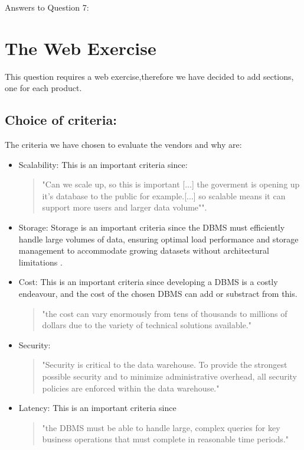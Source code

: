 \newpage Answers to Question 7:
\section{The Web Exercise}
This question requires a web exercise,therefore we have decided to add sections, one for each product. 

\subsection{Choice of criteria:}
The criteria we have chosen to evaluate the vendors and why are:
\begin{itemize}
    \item Scalability: This is an important criteria since:
    \begin{quotation}
        "Can we scale up, so this is important [...] the goverment is opening up it's database to the public for example.[...] so scalable means it can support more users and larger data volume"\cite[t.00:53:00]{l1video}".
    \end{quotation}
    \item Storage: Storage is an important criteria since
    the DBMS must efficiently handle large volumes of data, 
    ensuring optimal load performance and storage management to 
    accommodate growing datasets without architectural limitations \cite[p. 1239]{CourseLitt}.
    \item Cost: This is an important criteria since developing a DBMS is a costly endeavour, and the cost of the chosen DBMS can add or substract from this. \begin{quotation}
        "the cost can vary enormously from tens of thousands to millions of dollars due to
    the variety of technical solutions available." \cite[p. 1226]{CourseLitt}
    \end{quotation}
    \item Security: \begin{quote}
        "Security is critical to the data warehouse. To provide the strongest possible
security and to minimize administrative overhead, all security policies are enforced
within the data warehouse."\cite[p. 1309]{CourseLitt}
    \end{quote}
    \item Latency: This is an important criteria since \begin{quotation}
         "the DBMS must be able to handle large, complex queries for key business operations that must complete in reasonable time periods." \cite[p. 1239]{CourseLitt}
    \end{quotation} 
\end{itemize}
